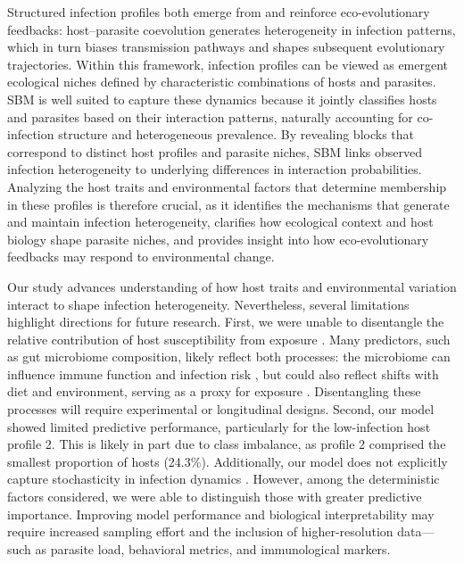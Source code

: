 \documentclass[oneside, a4paper, onecolumn, 11pt]{article}
\begin{document}
Structured infection profiles both emerge from and reinforce eco-evolutionary feedbacks: host–parasite coevolution generates heterogeneity in infection patterns, which in turn biases transmission pathways and shapes subsequent evolutionary trajectories. Within this framework, infection profiles can be viewed as emergent ecological niches defined by characteristic combinations of hosts and parasites. SBM is well suited to capture these dynamics because it jointly classifies hosts and parasites based on their interaction patterns, naturally accounting for co-infection structure and heterogeneous prevalence. By revealing blocks that correspond to distinct host profiles and parasite niches, SBM links observed infection heterogeneity to underlying differences in interaction probabilities. Analyzing the host traits and environmental factors that determine membership in these profiles is therefore crucial, as it identifies the mechanisms that generate and maintain infection heterogeneity, clarifies how ecological context and host biology shape parasite niches, and provides insight into how eco-evolutionary feedbacks may respond to environmental change.

Our study advances understanding of how host traits and environmental variation interact to shape infection heterogeneity. Nevertheless, several limitations highlight directions for future research. First, we were unable to disentangle the relative contribution of host susceptibility from exposure \citep{Sweeny2022-dm}. Many predictors, such as gut microbiome composition, likely reflect both processes: the microbiome can influence immune function and infection risk \citep{Rosshart2017-pu,Leung2018-qm}, but could also reflect shifts with diet and environment, serving as a proxy for exposure \citep{Markfeld2025-po,Fackelmann2021-zf}. Disentangling these processes will require experimental or longitudinal designs. Second, our model showed limited predictive performance, particularly for the low-infection host profile 2. This is likely in part due to class imbalance, as profile 2 comprised the smallest proportion of hosts (24.3\%). Additionally, our model does not explicitly capture stochasticity in infection dynamics \citep{May2023-te}. However, among the deterministic factors considered, we were able to distinguish those with greater predictive importance. Improving model performance and biological interpretability may require increased sampling effort and the inclusion of higher-resolution data---such as parasite load, behavioral metrics, and immunological markers.
\end{document}
